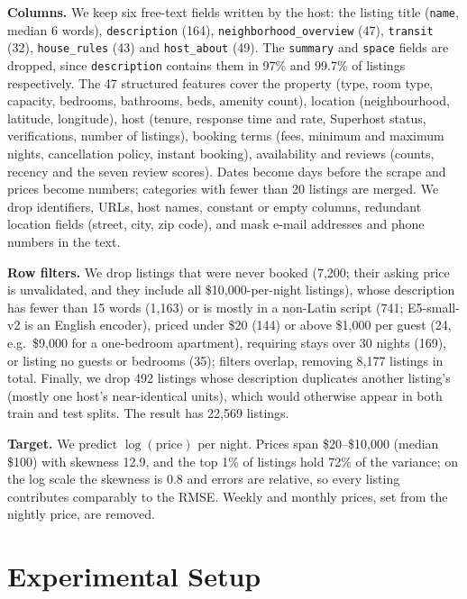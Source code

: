 \documentclass{article}
\begin{document}
\textbf{Columns.} We keep six free-text fields written by the host: the listing title (\texttt{name}, median 6
words), \texttt{description} (164), \texttt{neighborhood\_overview} (47), \texttt{transit} (32),
\texttt{house\_rules} (43) and \texttt{host\_about} (49). The \texttt{summary} and \texttt{space} fields are dropped,
since \texttt{description} contains them in 97\% and 99.7\% of listings respectively. The 47 structured features
cover the property (type, room type, capacity, bedrooms, bathrooms, beds, amenity count), location (neighbourhood,
latitude, longitude), host (tenure, response time and rate, Superhost status, verifications, number of listings),
booking terms (fees, minimum and maximum nights, cancellation policy, instant booking), availability and reviews
(counts, recency and the seven review scores). Dates become days before the scrape and prices become numbers;
categories with fewer than 20 listings are merged. We drop identifiers, URLs, host names, constant or empty columns,
redundant location fields (street, city, zip code), and mask e-mail addresses and phone numbers in the text.

\textbf{Row filters.} We drop listings that were never booked (7,200; their asking price is unvalidated, and they
include all \$10,000-per-night listings), whose description has fewer than 15 words (1,163) or is mostly in a
non-Latin script (741; E5-small-v2 is an English encoder), priced under \$20 (144) or above \$1,000 per guest
(24, e.g.\ \$9,000 for a one-bedroom apartment), requiring stays over 30 nights (169), or listing no guests or
bedrooms (35); filters overlap, removing 8,177 listings in total. Finally, we drop 492 listings whose description
duplicates another listing's (mostly one host's near-identical units), which would otherwise appear in both train and
test splits. The result has 22,569 listings.

\textbf{Target.} We predict $\log(\text{price})$ per night. Prices span \$20--\$10,000 (median \$100) with skewness
12.9, and the top 1\% of listings hold 72\% of the variance; on the log scale the skewness is 0.8 and errors are
relative, so every listing contributes comparably to the RMSE. Weekly and monthly prices, set from the nightly price,
are removed.

\section{Experimental Setup}
\end{document}
